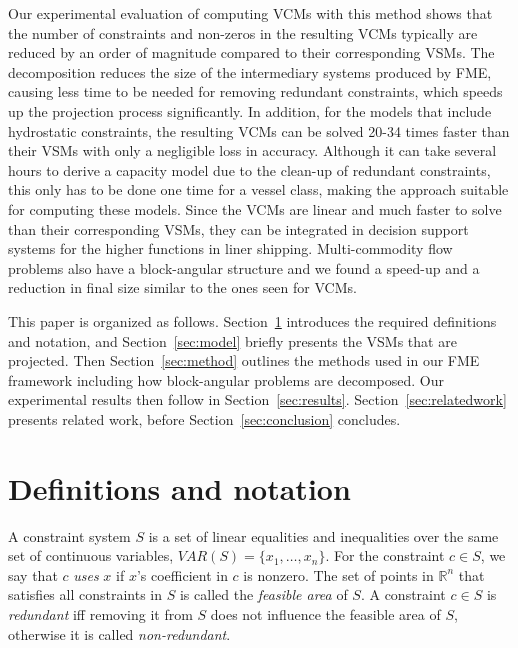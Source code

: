 \documentclass{llncs}
\newcommand{\VAR}{\mathit{VAR}}
\begin{document}
Our experimental evaluation of computing VCMs with this method shows that the number of constraints and non-zeros in the resulting VCMs typically are reduced by an order of magnitude compared to their corresponding VSMs. The decomposition reduces the size of the intermediary systems produced by FME, causing less time to be needed for removing redundant constraints, which speeds up the projection process significantly. In addition, for the models that include hydrostatic constraints, the resulting VCMs can be solved 20-34 times faster than their VSMs with only a negligible loss in accuracy. Although it can take several hours to derive a capacity model due to the clean-up of redundant constraints, this only has to be done one time for a vessel class, making the approach suitable for computing these models. Since the VCMs are linear and much faster to solve than their corresponding VSMs, they can be integrated in decision support systems for the higher functions in liner shipping. Multi-commodity flow problems also have a block-angular structure and we found a speed-up and a reduction in final size similar to the ones seen for VCMs.

This paper is organized as follows. Section~\ref{sec:notation} introduces the required definitions and notation, %
and Section~\ref{sec:model} briefly presents the VSMs that are projected. Then Section~\ref{sec:method} outlines the methods used in our FME framework including how block-angular problems are decomposed. Our experimental results then follow in Section~\ref{sec:results}. Section~\ref{sec:relatedwork} presents related work, before Section~\ref{sec:conclusion} concludes.
\section{Definitions and notation} \label{sec:notation}
A constraint system $S$ is a set of linear equalities and inequalities over the same set of continuous variables, $\VAR(S)=\{x_1,\ldots, x_n\}$.  
For the constraint $c\in S$, we say that $c$ \emph{uses} $x$ if $x$'s coefficient in $c$ is nonzero. 
The set of points in $\mathbb{R}^n$ that satisfies all constraints in $S$ is called the \emph{feasible area} of $S$. A constraint $c\in S$ is \emph{redundant} iff removing it from $S$ does not influence the feasible area of $S$, otherwise it is called \emph{non-redundant}.  
\end{document}
